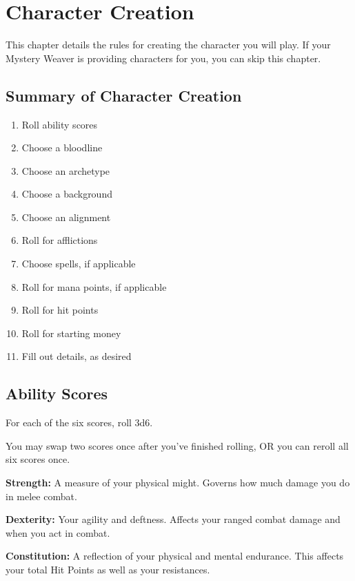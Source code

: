 \chapter{Character Creation}

\begin{multicols}{2}

This chapter details the rules for creating the character you will play.
If your Mystery Weaver is providing characters for you, you can skip this
chapter.

\section{Summary of Character Creation}

\begin{enumerate}
	\item Roll ability scores
	\item Choose a bloodline
	\item Choose an archetype
	\item Choose a background
	\item Choose an alignment
	\item Roll for afflictions
	\item Choose spells, if applicable
	\item Roll for mana points, if applicable
	\item Roll for hit points
	\item Roll for starting money
	\item Fill out details, as desired
\end{enumerate}

\section{Ability Scores}

For each of the six scores, roll 3d6.

You may swap two scores once after you've finished rolling, OR you can reroll
all six scores once.

\textbf{Strength:} A measure of your physical might. Governs how much damage you
do in melee combat.

\textbf{Dexterity:} Your agility and deftness. Affects your ranged combat damage
and when you act in combat.

\textbf{Constitution:} A reflection of your physical and mental endurance. This
affects your total Hit Points as well as your resistances.


\end{multicols}
